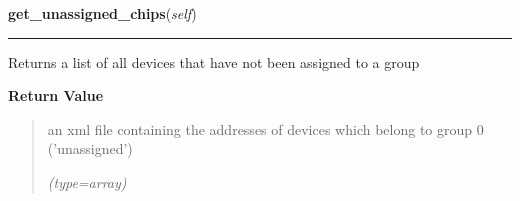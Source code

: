     \label{DBE:DBE:get_unassigned_chips}

    \vspace{0.5ex}

\hspace{.8\funcindent}\begin{boxedminipage}{\funcwidth}

    \raggedright \textbf{get\_unassigned\_chips}(\textit{self})

    \vspace{-1.5ex}

    \rule{\textwidth}{0.5\fboxrule}
\setlength{\parskip}{2ex}
    Returns a list of all devices that have not been assigned to a group

\setlength{\parskip}{1ex}
      \textbf{Return Value}
    \vspace{-1ex}

      \begin{quote}
      an xml file containing the addresses of devices which belong to group
      0 ('unassigned')

      {\it (type=array)}

      \end{quote}

    \end{boxedminipage}

    \label{DBE:DBE:get_measurements}

    \vspace{0.5ex}

